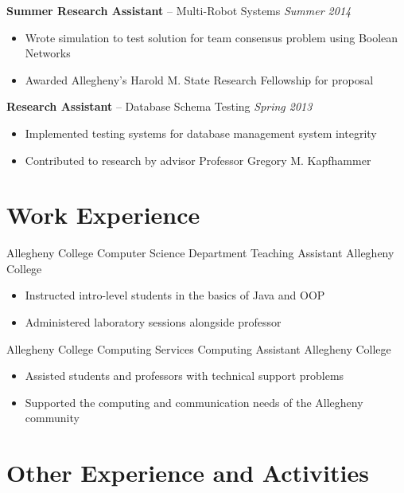\documentclass[11pt,letter,sans]{moderncv}
\begin{document}
    \textbf{Summer Research Assistant} -- Multi-Robot Systems
    \hfill
    \textit{Summer 2014}%
    \begin{itemize}
        \item Wrote simulation to test solution for team consensus
            problem using Boolean Networks
        \item Awarded Allegheny's Harold M. State Research Fellowship for
            proposal
    \end{itemize}
    \vspace{2mm}

    \textbf{Research Assistant} -- Database Schema Testing
    \hfill
    \textit{Spring 2013}%
    \begin{itemize}
        \item Implemented testing systems for database management system
            integrity
        \item Contributed to research by advisor Professor Gregory M.
            Kapfhammer
    \end{itemize}

\section{ Work Experience }

    {Allegheny College Computer Science Department}%
    {Teaching Assistant}%
    {Allegheny College}%
    {}%
    {
        \begin{itemize}
            \item Instructed intro-level students in the basics of Java and OOP
            \item Administered laboratory sessions alongside professor
        \end{itemize}
    }

    {Allegheny College Computing Services}%
    {Computing Assistant}%
    {Allegheny College}%
    {}%
    {
        \begin{itemize}
            \item Assisted students and professors with technical support
                problems
            \item Supported the computing and communication needs of the
                Allegheny community
        \end{itemize}
    }

\section{ Other Experience and Activities }
\end{document}
